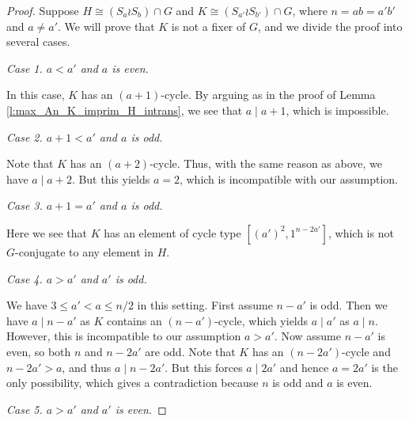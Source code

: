 \documentclass[twoside,a4paper,reqno,11pt]{amsart}
\newcommand{\<}{\langle}
\renewcommand{\>}{\rangle}
\newcommand{\leqs}{\leqslant}
\newcommand{\vs}{\vspace{2mm}}
\theoremstyle{definition}
\begin{document}
	\begin{proof}
		Suppose $H\cong (S_a\wr S_b)\cap G$ and $K\cong (S_{a'}\wr S_{b'})\cap G$, where $n = ab = a'b'$ and $a\ne a'$. We will prove that $K$ is not a fixer of $G$, and we divide the proof into several cases.
		
		\vs
		
		\noindent \textit{Case 1. $a<a'$ and $a$ is even.}
		
		\vs
		
		In this case, $K$ has an $(a+1)$-cycle. By arguing as in the proof of Lemma \ref{l:max_An_K_imprim_H_intrans}, we see that $a\mid a+1$, which is impossible.
		
		\vs
		
		\noindent \textit{Case 2. $a+1<a'$ and $a$ is odd.}
		
		\vs
		
		Note that $K$ has an $(a+2)$-cycle. Thus, with the same reason as above, we have $a\mid a+2$. But this yields $a = 2$, which is incompatible with our assumption.
		
		\vs
		
		\noindent \textit{Case 3. $a+1=a'$ and $a$ is odd.}
		
		\vs
		
		Here we see that $K$ has an element of cycle type $[(a')^2,1^{n-2a'}]$, which is not $G$-conjugate to any element in $H$.
		
		\vs
		
		\noindent \textit{Case 4. $a > a'$ and $a'$ is odd.}
		
		\vs
		
		We have $3\leqs a' < a\leqs n/2$ in this setting. First assume $n-a'$ is odd. Then we have $a\mid n-a'$ as $K$ contains an $(n-a')$-cycle, which yields $a\mid a'$ as $a\mid n$. However, this is incompatible to our assumption $a > a'$. Now assume $n-a'$ is even, so both $n$ and $n-2a'$ are odd. Note that $K$ has an $(n-2a')$-cycle and $n-2a' > a$, and thus $a\mid n-2a'$. But this forces $a\mid 2a'$ and hence $a = 2a'$ is the only possibility, which gives a contradiction because $n$ is odd and $a$ is even.
		
		\vs
		
		\noindent \textit{Case 5. $a > a'$ and $a'$ is even.}
		
		\vs
		

\end{proof}
\end{document}

